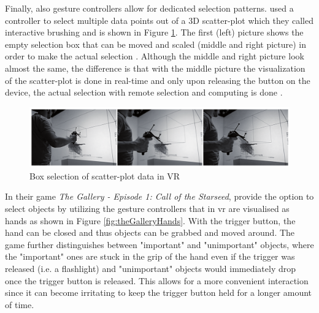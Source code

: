 Finally, also gesture controllers allow for dedicated selection patterns. \cite{Hentschel2009} used a controller to select multiple data points out of a 3D scatter-plot which they called interactive brushing and is shown in Figure \ref{fig:interactivebrushing}. The first (left) picture shows the empty selection box that can be moved and scaled (middle and right picture) in order to make the actual selection \citep{Hentschel2009}. Although the middle and right picture look almost the same, the difference is that with the middle picture the visualization of the scatter-plot is done in real-time and only upon releasing the button on the device, the actual selection with remote selection and computing is done \citep{Hentschel2009}.
\begin{figure}[h]
	\begin{center}
		\includegraphics[width=14cm]{03_Figures/05_LitReview/Hentschel2009_InteractiveBrushing.png}
		\caption[Box selection of scatter-plot data in VR]{Box selection of scatter-plot data in VR \citep{Hentschel2009}}
		\label{fig:interactivebrushing}
	\end{center}
\end{figure} \newline
In their game \textit{The Gallery - Episode 1: Call of the Starseed}, \cite{CloudheadGames2016} provide the option to select objects by utilizing the gesture controllers that in \gls{vr} are visualised as hands as shown in Figure \ref{fig:theGalleryHands}. With the trigger button, the hand can be closed and thus objects can be grabbed and moved around. The game further distinguishes between "important" and "unimportant" objects, where the "important" ones are stuck in the grip of the hand even if the trigger was released (i.e. a flashlight) and "unimportant" objects would immediately drop once the trigger button is released. This allows for a more convenient interaction since it can become irritating to keep the trigger button held for a longer amount of time. \newline
